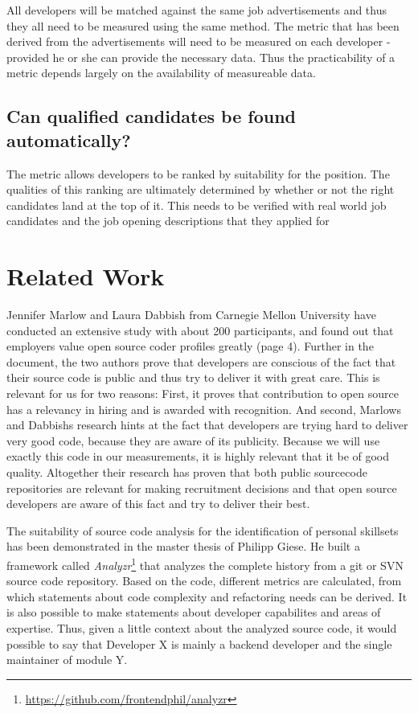 All developers will be matched against the same job advertisements and thus
they all need to be measured using the same method. The metric that
has been derived from the advertisements will need to be measured
on each developer - provided he or she can provide the necessary data.
Thus the practicability of a metric depends largely on the availability
of measureable data.

\subsection{Can qualified candidates be found automatically?}\label{subsec:measurement-quality}
The metric allows developers to be ranked by suitability for the position.
The qualities of this ranking are ultimately determined by whether
or not the right candidates land at the top of it. This needs to be
verified with real world job candidates and the job opening descriptions
that they applied for

\section{Related Work}
Jennifer Marlow and Laura Dabbish\cite{md:2013} from Carnegie Mellon
University have conducted an extensive study with about
200 participants, and found out that employers value
open source coder profiles greatly (page 4). Further in the document,
the two authors prove that developers are conscious of the fact
that their source code is public and thus try to deliver it with
great care. This is relevant for us for two reasons:
First, it proves that contribution to open source has a relevancy
in hiring and is awarded with recognition. And second, Marlows and Dabbishs
research hints at the fact that developers are trying hard to deliver very
good code, because they are aware of its publicity. Because we will use
exactly this code in our measurements, it is highly relevant that it be of good quality.
Altogether their research has proven that both public sourcecode repositories
are relevant for making recruitment decisions and that open source developers
are aware of this fact and try to deliver their best.
\newline

The suitability of source code analysis for the identification of personal
skillsets has been demonstrated in the master thesis of Philipp Giese.
He built a framework called \textit{Analyzr}\footnote{\url{https://github.com/frontendphil/analyzr}}
that analyzes the complete history from a git or SVN source code repository.
Based on the code, different metrics are calculated, from which statements about
code complexity and refactoring needs can be derived. It is also possible
to make statements about developer capabilites and areas of expertise.
Thus, given a little context about the analyzed source code, it would possible
to say that \glqq Developer X is mainly a backend developer and the single maintainer of module Y\grqq.

